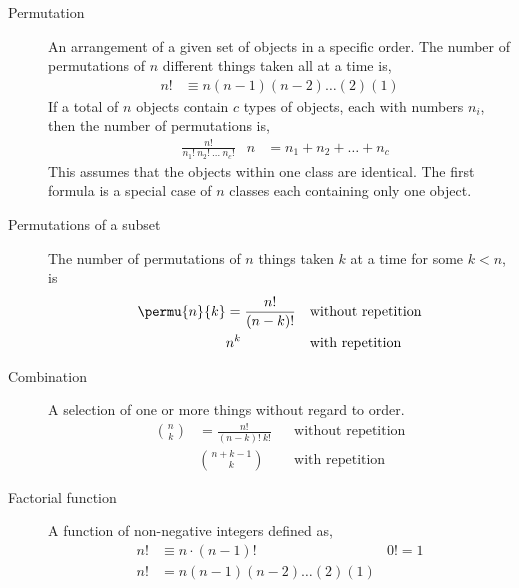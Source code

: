 \begin{description}
    \item[Permutation] An arrangement of a given set of objects in a specific order.
          The number of permutations of $ n $ different things taken all at a time is,
          \begin{align}
              n! & \equiv n(n-1)(n-2)\dots(2)(1)
          \end{align}
          If a total of $ n $ objects contain $ c $ types of objects, each with numbers
          $ n_i $, then the number of permutations is,
          \begin{align}
                & \frac{n!}{n_1!\ n_2!\ \dots\ n_c!} &
              n & = n_1 + n_2 + \dots + n_c
          \end{align}
          This assumes that the objects within one class are identical. The first
          formula is a special case of $ n $ classes each containing only one object.

    \item[Permutations of a subset] The number of permutations of $ n $ things
          taken $ k $ at a time for some $ k<n $, is
          \begin{align}
              \permu{n}{k} & = \frac{n!}{(n-k)!}       &
                           & \text{without repetition}   \\
                           & n^k                       &
                           & \text{with repetition}
          \end{align}

    \item[Combination] A selection of one or more things without regard to order.
          \begin{align}
              \binom{n}{k} & = \frac{n!}{(n-k)!\ k!}   &
                           & \text{without repetition}   \\
                           & \binom{n+k-1}{k}          &
                           & \text{with repetition}
          \end{align}

    \item[Factorial function] A function of non-negative integers defined as,
          \begin{align}
              n! & \equiv n \cdot (n-1)!    & 0! = 1 \\
              n! & = n(n-1)(n-2)\dots(2)(1)
          \end{align}


\end{description}
